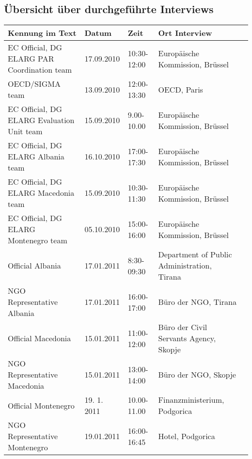 \begin{landscape}
\renewcommand{\arraystretch}{1.5}
\chapter{Übersicht über durchgeführte Interviews}
\label{Übersicht über durchgeführte Interviews}	
\begin{table}[!hbt]\vspace{1ex}\centering		
\begin{tabular}{|l|l|l|l|l|}\hline
Kennung im Text&Datum&	Zeit&	Ort Interview\\\hline\hline
EC Official, DG ELARG PAR Coordination team&17.09.2010&10:30-12:00&Europäische Kommission, Brüssel\\
OECD/SIGMA team&13.09.2010&12:00-13:30&OECD, Paris\\
EC Official, DG ELARG Evaluation Unit team&	15.09.2010	&9.00-10.00&	Europäische Kommission, Brüssel\\
EC Official, DG ELARG Albania team&	16.10.2010	&17:00-17:30	&Europäische Kommission, Brüssel\\
EC Official, DG ELARG Macedonia team&	15.09.2010	&10:30-11:30&	Europäische Kommission, Brüssel\\
EC Official, DG ELARG Montenegro team&	05.10.2010&	15:00-16:00&	Europäische Kommission, Brüssel\\
Official Albania&	17.01.2011&	8:30-09:30	&Department of Public Administration, Tirana\\
NGO Representative Albania	&17.01.2011&	16:00-17:00	&Büro der NGO, Tirana\\
Official Macedonia	&15.01.2011&	11:00-12:00&	Büro der Civil Servants Agency, Skopje\\
NGO Representative Macedonia	&15.01.2011	&13:00-14:00	&Büro der NGO, Skopje\\
Official Montenegro	&19. 1. 2011&	10.00-11.00&	Finanzministerium, Podgorica\\
NGO Representative Montenegro	&19.01.2011&	16:00-16:45&	Hotel, Podgorica\\\hline
\end{tabular}
	\end{table}	
	\end{landscape}	
